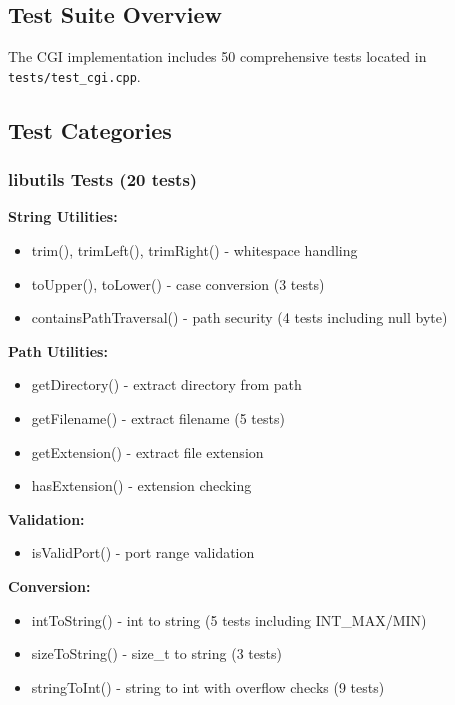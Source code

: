 \documentclass[11pt,a4paper]{article}
\begin{document}
\subsection{Test Suite Overview}

The CGI implementation includes 50 comprehensive tests located in \texttt{tests/test\_cgi.cpp}.

\subsection{Test Categories}

\subsubsection{libutils Tests (20 tests)}

\textbf{String Utilities:}
\begin{itemize}
    \item trim(), trimLeft(), trimRight() - whitespace handling
    \item toUpper(), toLower() - case conversion (3 tests)
    \item containsPathTraversal() - path security (4 tests including null byte)
\end{itemize}

\textbf{Path Utilities:}
\begin{itemize}
    \item getDirectory() - extract directory from path
    \item getFilename() - extract filename (5 tests)
    \item getExtension() - extract file extension
    \item hasExtension() - extension checking
\end{itemize}

\textbf{Validation:}
\begin{itemize}
    \item isValidPort() - port range validation
\end{itemize}

\textbf{Conversion:}
\begin{itemize}
    \item intToString() - int to string (5 tests including INT\_MAX/MIN)
    \item sizeToString() - size\_t to string (3 tests)
    \item stringToInt() - string to int with overflow checks (9 tests)
\end{itemize}
\end{document}
